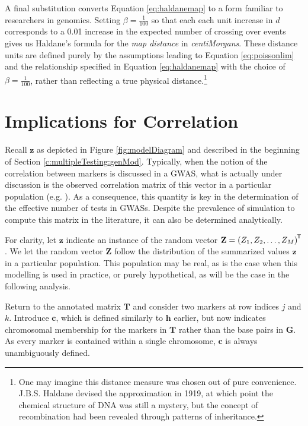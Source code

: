 \documentclass{article}
\newcommand{\ve}[1]{\mathbf{#1}}           %
\newcommand{\m}[1]{\mathbf{#1}}               %
\newcommand{\tr}[1]{{#1}^{\mkern-1.5mu\mathsf{T}}}              %
\begin{document}
\noindent A final substitution converts Equation \ref{eq:haldanemap} to a form familiar to researchers in genomics. Setting $\beta = \frac{1}{100}$ so that each each unit increase in $d$ corresponds to a 0.01 increase in the expected number of crossing over events gives us Haldane's formula for the \textit{map distance} in \textit{centiMorgans}. These distance units are defined purely by the assumptions leading to Equation \ref{eq:poissonlim} and the relationship specified in Equation \ref{eq:haldanemap} with the choice of $\beta = \frac{1}{100}$, rather than reflecting a true physical distance.\footnote{One may imagine this distance measure was chosen out of pure convenience. J.B.S. Haldane devised the approximation in 1919, at which point the chemical structure of DNA was still a mystery, but the concept of recombination had been revealed through patterns of inheritance.}

\section{Implications for Correlation} \label{subsec:correlation}

Recall $\ve{z}$ as depicted in Figure \ref{fig:modelDiagram} and described in the beginning of Section \ref{c:multipleTesting:genMod}. Typically, when the notion of the correlation between markers is discussed in a GWAS, what is actually under discussion is the observed correlation matrix of this vector in a particular population (e.g. \cite{cheverud2001}). As a consequence, this quantity is key in the determination of the effective number of tests in GWASs. Despite the prevalence of simulation to compute this matrix in the literature, it can also be determined analytically.

For clarity, let $\ve{z}$ indicate an instance of the random vector $\ve{Z} = \tr{(Z_1, Z_2, \dots, Z_M)}$. We let the random vector $\ve{Z}$ follow the distribution of the summarized values $\ve{z}$ in a particular population. This population may be real, as is the case when this modelling is used in practice, or purely hypothetical, as will be the case in the following analysis.

Return to the annotated matrix $\m{T}$ and consider two markers at row indices $j$ and $k$. Introduce $\ve{c}$, which is defined similarly to $\ve{h}$ earlier, but now indicates chromosomal membership for the markers in $\m{T}$ rather than the base pairs in $\m{G}$. As every marker is contained within a single chromosome, $\ve{c}$ is always unambiguously defined.
\end{document}
